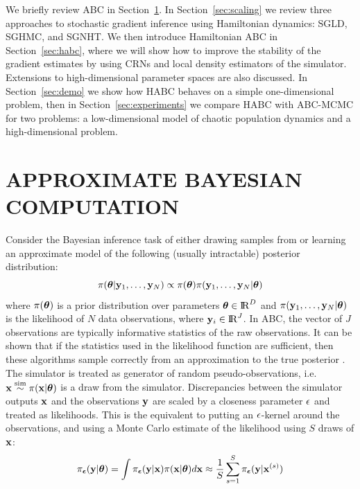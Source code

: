 \documentclass[]{article}
\begin{document}
 
We briefly review ABC in Section~\ref{sec:abc}.  In Section~\ref{sec:scaling} we review three approaches to stochastic gradient inference using Hamiltonian dynamics: SGLD, SGHMC, and SGNHT.  We then introduce Hamiltonian ABC in Section~\ref{sec:habc}, where  we will show how to improve the stability of the gradient estimates by using CRNs and local density estimators of the simulator.  Extensions to high-dimensional parameter spaces are also discussed.  In Section~\ref{sec:demo} we show how HABC behaves on a simple one-dimensional problem, then in Section~\ref{sec:experiments} we compare HABC with ABC-MCMC for two problems: a low-dimensional model of chaotic population dynamics and a high-dimensional problem. 
 


\section{APPROXIMATE BAYESIAN COMPUTATION}\label{sec:abc}
Consider the Bayesian inference task of either drawing samples from or learning an approximate model of the following (usually intractable) posterior distribution:
\begin{equation}
  \pi({\bm \theta} | {\bf y}_1, \ldots, {\bf y}_N ) \propto \pi({\bm \theta}) \pi( {\bf y}_1, \ldots, {\bf y}_N  | {\bm \theta} )
\end{equation}
where $\pi({\bm \theta})$ is a prior distribution over parameters ${\bm \theta} \in {\rm I\!R}^{D}$ and $\pi( {\bf y}_1, \ldots, {\bf y}_N  | {\bm \theta} )$ is the likelihood of $N$ data observations, where ${\bf y}_i \in {\rm I\!R}^J$.  In ABC, the vector of $J$ observations are typically informative statistics of the raw observations.  It can be shown that if the statistics used in the likelihood function are sufficient, then these algorithms sample correctly from an approximation to the true posterior \cite{abc-sources}.  
  The simulator is treated as generator of random pseudo-observations, i.e. ${\bf x} \overset{\operatorname{sim}}{\sim} \pi( {\bf x} | {\bm \theta} )$ is a draw from the simulator.  Discrepancies between the simulator outputs ${\bf x}$ and the observations ${\bf y}$ are scaled by a closeness parameter $\epsilon$ and treated as likelihoods.  This is the equivalent to putting an $\epsilon$-kernel around the observations, and using a Monte Carlo estimate of the likelihood using $S$ draws of ${\bf x}$: 
\begin{equation}
  \pi_{{\bm {\epsilon}}}( {\bf y} | {\bm \theta} ) =  \int \pi_{{\bm {\epsilon}}}({\bf y} | {\bf x} ) \pi( {\bf x} | {\bm \theta} ) d{\bf x} 
                           \approx  \frac{1}{S} \sum_{s=1}^S \pi_{{\bm {\epsilon}}}({\bf y} | {\bf x}^{(s)} ) \label{eq:abc_mc_approx}
\end{equation}
\end{document}
